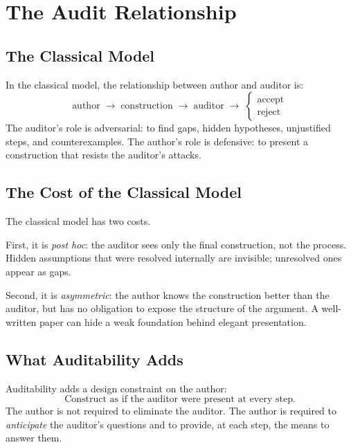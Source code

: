 \documentclass[11pt,a4paper]{article}
\theoremstyle{definition}
\theoremstyle{plain}
\begin{document}
\section{The Audit Relationship}
\label{sec:audit-classical}

\subsection{The Classical Model}

In the classical model, the relationship between author and
auditor is:
\[
  \text{author} \;\longrightarrow\; \text{construction}
  \;\longrightarrow\; \text{auditor} \;\longrightarrow\;
  \begin{cases} \text{accept} \\ \text{reject} \end{cases}
\]
The auditor's role is adversarial: to find gaps, hidden
hypotheses, unjustified steps, and counterexamples. The author's
role is defensive: to present a construction that resists the
auditor's attacks.

\subsection{The Cost of the Classical Model}

The classical model has two costs.

First, it is \emph{post hoc}: the auditor sees only the final
construction, not the process. Hidden assumptions that were
resolved internally are invisible; unresolved ones appear as
gaps.

Second, it is \emph{asymmetric}: the author knows the construction
better than the auditor, but has no obligation to expose the
structure of the argument. A well-written paper can hide a weak
foundation behind elegant presentation.

\subsection{What Auditability Adds}

Auditability adds a design constraint on the author:
\[
  \boxed{
    \text{Construct as if the auditor were present at every step.}
  }
\]
The author is not required to eliminate the auditor. The author is
required to \emph{anticipate} the auditor's questions and to
provide, at each step, the means to answer them.
\end{document}
